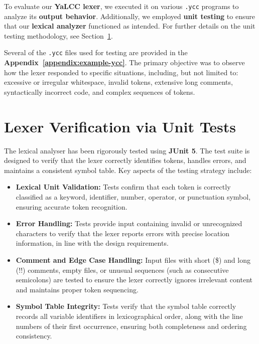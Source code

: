 \documentclass{article}
\begin{document}
\noindent To evaluate our \textbf{YaLCC lexer}, we executed it on various \texttt{.ycc} programs to analyze its \textbf{output behavior}. Additionally, we employed \textbf{unit testing} to ensure that our \textbf{lexical analyzer} functioned as intended. For further details on the unit testing methodology, see Section~\ref{section:tests}.  

\noindent Several of the \texttt{.ycc} files used for testing are provided in the \textbf{Appendix~\ref{appendix:example-ycc}}. The primary objective was to observe how the lexer responded to specific situations, including, but not limited to: excessive or irregular whitespace, invalid tokens, extensive long comments, syntactically incorrect code, and complex sequences of tokens.


\section{Lexer Verification via Unit Tests}
\label{section:tests}

\noindent The lexical analyser has been rigorously tested using \textbf{JUnit 5}. The test suite is designed to verify that the lexer correctly identifies tokens, handles errors, and maintains a consistent symbol table. Key aspects of the testing strategy include:

\begin{itemize}
    \item \textbf{Lexical Unit Validation:} Tests confirm that each token is correctly classified as a keyword, identifier, number, operator, or punctuation symbol, ensuring accurate token recognition.
    \item \textbf{Error Handling:} Tests provide input containing invalid or unrecognized characters to verify that the lexer reports errors with precise location information, in line with the design requirements.
    \item \textbf{Comment and Edge Case Handling:} Input files with short (\$) and long (!!) comments, empty files, or unusual sequences (such as consecutive semicolons) are tested to ensure the lexer correctly ignores irrelevant content and maintains proper token sequencing.
    \item \textbf{Symbol Table Integrity:} Tests verify that the symbol table correctly records all variable identifiers in lexicographical order, along with the line numbers of their first occurrence, ensuring both completeness and ordering consistency.
\end{itemize}
\end{document}
